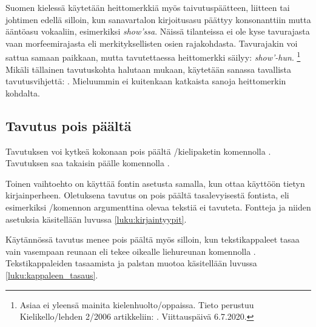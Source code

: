 Suomen kielessä käytetään heittomerkkiä myös taivutuspäätteen, liitteen
tai johtimen edellä silloin, kun sanavartalon kir\-joi\-tus\-asu päättyy
konsonanttiin mutta ääntö\-asu vokaaliin, esimerkiksi \emph{show'ssa}.
Näissä tilanteissa ei ole kyse tavurajasta vaan morfeemirajasta eli
merkityksellisten osien rajakohdasta. Tavurajakin voi sattua samaan
paikkaan, mutta tavutettaessa heittomerkki säilyy: \emph{show'-hun}.%
\footnote{Asiaa ei yleensä mainita kielenhuolto\-/oppaissa. Tieto
  perustuu Kielikello\-/lehden 2/2006 artikkeliin:
  . Viittauspäivä
  6.7.2020.} Mikäli tällainen tavutuskohta halutaan mukaan, käytetään
sanassa tavallista tavutusvihjettä: . Mieluummin
ei kuitenkaan katkaista sanoja heittomerkin kohdalta.

\subsection{Tavutus pois päältä}

Tavutuksen voi kytkeä kokonaan pois päältä
\-/kielipaketin komennolla%
 . Tavutuksen saa takaisin päälle komennolla
.

Toinen vaihtoehto on käyttää fontin asetusta  samalla, kun ottaa käyttöön tietyn kirjainperheen. Oletuksena
tavutus on pois päältä tasalevyisestä fontista, eli esimerkiksi
\-/komennon argumenttina olevaa tekstiä ei
tavuteta. Fontteja ja niiden asetuksia käsitellään luvussa
\ref{luku:kirjaintyypit}.

Käytännössä tavutus menee pois päältä myös silloin, kun tekstikappaleet
tasaa vain vasempaan reunaan eli tekee oikealle liehureunan komennolla
. Tekstikappaleiden tasaamista ja palstan
muotoa käsitellään luvussa \ref{luku:kappaleen_tasaus}.
